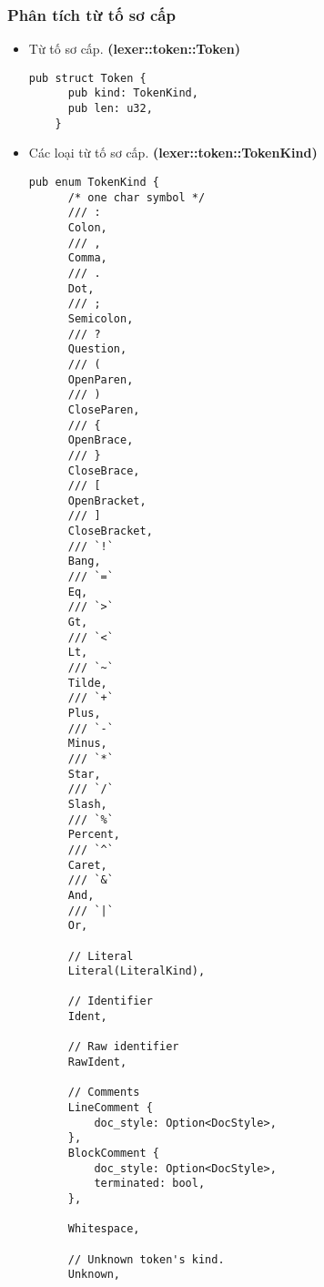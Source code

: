{\subsubsection{Phân tích từ tố sơ cấp}
\begin{itemize}
  \item \label{ap1:simple_token}Từ tố sơ cấp. \textbf{(lexer::token::Token)}
  \begin{lstlisting}[]
    pub struct Token {
      pub kind: TokenKind,
      pub len: u32,
    }
  \end{lstlisting}
  \item \label{ap1:simple_token_kind}Các loại từ tố sơ cấp. \textbf{(lexer::token::TokenKind)}
  \begin{lstlisting}[]
    pub enum TokenKind {
      /* one char symbol */
      /// :
      Colon,
      /// ,
      Comma,
      /// .
      Dot,
      /// ;
      Semicolon,
      /// ?
      Question,
      /// (
      OpenParen,
      /// )
      CloseParen,
      /// {
      OpenBrace,
      /// }
      CloseBrace,
      /// [
      OpenBracket,
      /// ]
      CloseBracket,
      /// `!`
      Bang,
      /// `=`
      Eq,
      /// `>`
      Gt,
      /// `<`
      Lt,
      /// `~`
      Tilde,
      /// `+`
      Plus,
      /// `-`
      Minus,
      /// `*`
      Star,
      /// `/`
      Slash,
      /// `%`
      Percent,
      /// `^`
      Caret,
      /// `&`
      And,
      /// `|`
      Or,

      // Literal
      Literal(LiteralKind),

      // Identifier
      Ident,

      // Raw identifier
      RawIdent,

      // Comments
      LineComment {
          doc_style: Option<DocStyle>,
      },
      BlockComment {
          doc_style: Option<DocStyle>,
          terminated: bool,
      },

      Whitespace,

      // Unknown token's kind.
      Unknown,


\end{lstlisting}
\end{itemize}}
